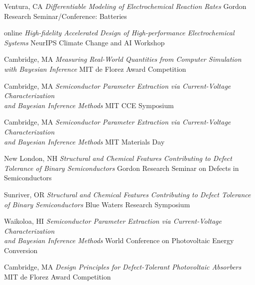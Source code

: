     {Ventura, CA}
    {\textit{Differentiable Modeling of Electrochemical Reaction Rates}}
    {Gordon Research Seminar/Conference: Batteries}

\vspace{\talksep}
    {online}
    {\textit{High-fidelity Accelerated Design of High-performance Electrochemical Systems}}
    {NeurIPS Climate Change and AI Workshop}

\vspace{\talkyearsep}
    {Cambridge, MA}
    {\textit{Measuring Real-World Quantities from Computer Simulation with Bayesian Inference}}
    {MIT de Florez Award Competition}

\vspace{\talksep}
\datedsubsection{}
    {Cambridge, MA}
    {\textit{Semiconductor Parameter Extraction via Current-Voltage Characterization \\and Bayesian Inference Methods}}
    {MIT CCE Symposium}

\vspace{\talkyearsep}
    {Cambridge, MA}
    {\textit{Semiconductor Parameter Extraction via Current-Voltage Characterization \\and Bayesian Inference Methods}}
    {MIT Materials Day}

\vspace{\talksep}
\datedsubsection{}
    {New London, NH}
    {\textit{Structural and Chemical Features Contributing to Defect Tolerance of Binary Semiconductors}}
    {Gordon Research Seminar on Defects in Semiconductors}

\vspace{\talksep}
\datedsubsection{}
    {Sunriver, OR}
    {\textit{Structural and Chemical Features Contributing to Defect Tolerance of Binary Semiconductors}}
    {Blue Waters Research Symposium}

\vspace{\talksep}
\datedsubsection{}
    {Waikoloa, HI}
    {\textit{Semiconductor Parameter Extraction via Current-Voltage Characterization \\and Bayesian Inference Methods}}
    {World Conference on Photovoltaic Energy Conversion}

\vspace{\talksep}
\datedsubsection{}
    {Cambridge, MA}
    {\textit{Design Principles for Defect-Tolerant Photovoltaic Absorbers}}
    {MIT de Florez Award Competition}

